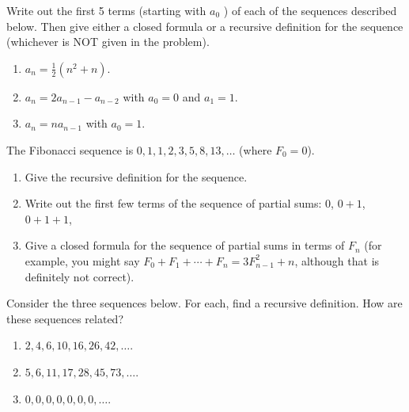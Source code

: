 \documentclass[11pt,]{book}
\theoremstyle{ptxplainnotitle}
\theoremstyle{ptxplaintitle}
\theoremstyle{ptxdefinitionnotitle}
\theoremstyle{ptxdefinitiontitle}
\theoremstyle{ptxdefinitionnotitle}
\theoremstyle{ptxdefinitiontitle}
\theoremstyle{ptxdefinitionnotitle}
\theoremstyle{ptxdefinitiontitle}
\theoremstyle{ptxdefinitiontitlenonumber}
\theoremstyle{ptxdefinitiontitlenonumber}
\numberwithin{equation}{chapter}
\begin{document}
\begin{divisionexercise}{3}\hypertarget{exercise-3}{}
\hypertarget{p-121}{}%
Write out the first 5 terms (starting with \(a_0\) ) of each of the sequences described below.  Then give either a closed formula or a recursive definition for the sequence (whichever is NOT given in the problem). \leavevmode%
\begin{enumerate}[label=(\alph*)]
\item\hypertarget{li-82}{}\hypertarget{p-122}{}%
\(a_n = \frac{1}{2}(n^2 + n)\).%
\item\hypertarget{li-83}{}\hypertarget{p-123}{}%
\(a_n = 2a_{n-1} - a_{n-2}\) with \(a_0 = 0\) and \(a_1 = 1\).%
\item\hypertarget{li-84}{}\hypertarget{p-124}{}%
\(a_n = na_{n-1}\) with \(a_0 = 1\).%
\end{enumerate}
%
\end{divisionexercise}%
\begin{divisionexercise}{4}\hypertarget{exercise-4}{}
\hypertarget{p-129}{}%
The Fibonacci sequence is \(0, 1, 1, 2, 3, 5, 8, 13, \ldots\) (where \(F_0 = 0\)). \leavevmode%
\begin{enumerate}[label=(\alph*)]
\item\hypertarget{li-88}{}\hypertarget{p-130}{}%
Give the recursive definition for the sequence.%
\item\hypertarget{li-89}{}\hypertarget{p-131}{}%
Write out the first few terms of the sequence of partial sums: \(0\), \(0+1\), \(0+1+1\),\textellipsis{}%
\item\hypertarget{li-90}{}\hypertarget{p-132}{}%
Give a closed formula for the sequence of partial sums in terms of \(F_n\)\label{notation-3}
 (for example, you might say \(F_0 + F_1 + \cdots + F_n = 3F_{n-1}^2 + n\), although that is definitely not correct).%
\end{enumerate}
%
\end{divisionexercise}%
\begin{divisionexercise}{5}\hypertarget{exercise-5}{}
\hypertarget{p-134}{}%
Consider the three sequences below. For each, find a recursive definition. How are these sequences related? \leavevmode%
\begin{enumerate}[label=(\alph*)]
\item\hypertarget{li-94}{}\(2, 4, 6, 10, 16, 26, 42, \ldots\).%
\item\hypertarget{li-95}{}\(5, 6, 11, 17, 28, 45, 73, \ldots\).%
\item\hypertarget{li-96}{}\(0, 0 , 0 , 0 , 0 , 0 , 0 ,\ldots\).%
\end{enumerate}
%
\end{divisionexercise}%
\end{document}
